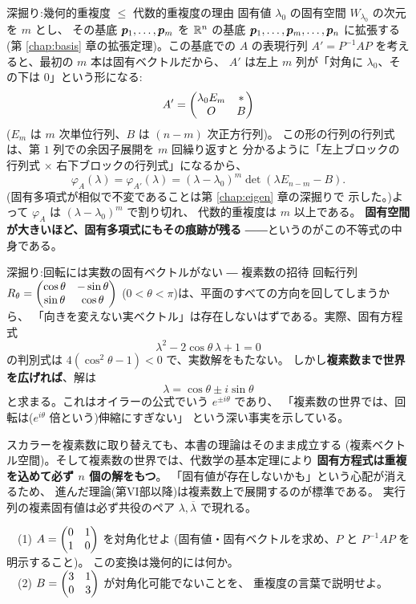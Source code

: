 \begin{itembox}[l]{深掘り:幾何的重複度 $\le$ 代数的重複度の理由}
固有値 $\lambda_0$ の固有空間 $W_{\lambda_0}$ の次元を $m$ とし、
その基底 $\bm{p}_1, \dots, \bm{p}_m$ を $\mathbb{R}^n$ の基底
$\bm{p}_1, \dots, \bm{p}_m, \dots, \bm{p}_n$ に拡張する
(第 \ref{chap:basis} 章の拡張定理)。この基底での $A$ の表現行列
$A' = P^{-1}AP$ を考えると、最初の $m$ 本は固有ベクトルだから、
$A'$ は左上 $m$ 列が「対角に $\lambda_0$、その下は $0$」という形になる:
\[
A' = \begin{pmatrix}\lambda_0 E_m & * \\ O & B\end{pmatrix}
\]
($E_m$ は $m$ 次単位行列、$B$ は $(n-m)$ 次正方行列)。
この形の行列の行列式は、第 $1$ 列での余因子展開を $m$ 回繰り返すと
分かるように「左上ブロックの行列式 × 右下ブロックの行列式」になるから、
\[
\varphi_A(\lambda) = \varphi_{A'}(\lambda)
= (\lambda - \lambda_0)^m \det(\lambda E_{n-m} - B).
\]
(固有多項式が相似で不変であることは第 \ref{chap:eigen} 章の深掘りで
示した。)よって $\varphi_A$ は $(\lambda - \lambda_0)^m$ で割り切れ、
代数的重複度は $m$ 以上である。
\textbf{固有空間が大きいほど、固有多項式にもその痕跡が残る}
――というのがこの不等式の中身である。
\end{itembox}

\begin{itembox}[l]{深掘り:回転には実数の固有ベクトルがない ― 複素数の招待}
回転行列 $R_\theta = \begin{pmatrix}\cos\theta & -\sin\theta \\ \sin\theta & \cos\theta\end{pmatrix}$
($0 < \theta < \pi$)は、平面のすべての方向を回してしまうから、
「向きを変えない実ベクトル」は存在しないはずである。実際、固有方程式
\[
\lambda^2 - 2\cos\theta\,\lambda + 1 = 0
\]
の判別式は $4(\cos^2\theta - 1) < 0$ で、実数解をもたない。
しかし\textbf{複素数まで世界を広げれば}、解は
\[
\lambda = \cos\theta \pm i\sin\theta
\]
と求まる。これはオイラーの公式でいう $e^{\pm i\theta}$ であり、
「複素数の世界では、回転は($e^{i\theta}$ 倍という)伸縮にすぎない」
という深い事実を示している。

スカラーを複素数に取り替えても、本書の理論はそのまま成立する
(複素ベクトル空間)。そして複素数の世界では、代数学の基本定理により
\textbf{固有方程式は重複を込めて必ず $n$ 個の解をもつ}。
「固有値が存在しないかも」という心配が消えるため、
進んだ理論(第VI部以降)は複素数上で展開するのが標準である。
実行列の複素固有値は必ず共役のペア $\lambda, \overline{\lambda}$ で現れる。
\end{itembox}

\begin{mondai}\label{q:diag}
　(1) $A = \begin{pmatrix}0 & 1 \\ 1 & 0\end{pmatrix}$ を対角化せよ
(固有値・固有ベクトルを求め、$P$ と $P^{-1}AP$ を明示すること)。
この変換は幾何的には何か。\\
　(2) $B = \begin{pmatrix}3 & 1 \\ 0 & 3\end{pmatrix}$ が対角化可能でないことを、
重複度の言葉で説明せよ。
\end{mondai}

